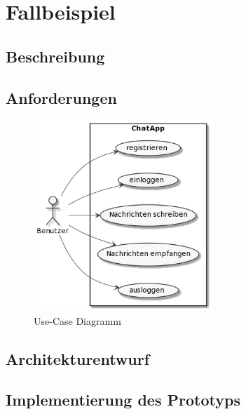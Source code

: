 \chapter{Fallbeispiel}

\section{Beschreibung}
\section{Anforderungen}

\begin{figure}[bth] 
	\centering
	\includegraphics[width=0.6\textwidth]{Graphics/Usecase-Diagramm.png}
	\caption{Use-Case Diagramm}
\end{figure}

\section{Architekturentwurf}
\section{Implementierung des Prototyps}

